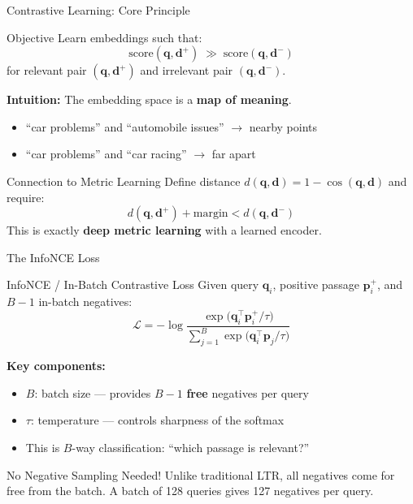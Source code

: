 \documentclass[aspectratio=169]{beamer}
\newif\ifanimated
\newcommand{\cpause}{\ifanimated\pause\fi}
\newcommand{\vq}{\mathbf{q}}
\newcommand{\vp}{\mathbf{p}}
\newcommand{\vd}{\mathbf{d}}
\begin{document}
\begin{frame}[plain]
\sectionpage
\end{frame}

\begin{frame}{Contrastive Learning: Core Principle}
\begin{block}{Objective}
Learn embeddings such that:
$$\text{score}(\vq, \vd^+) \;\gg\; \text{score}(\vq, \vd^-)$$
for relevant pair $(\vq, \vd^+)$ and irrelevant pair $(\vq, \vd^-)$.
\end{block}

\cpause
\vspace{1em}

\textbf{Intuition:} The embedding space is a \textbf{map of meaning}.
\begin{itemize}
    \item ``car problems'' and ``automobile issues'' $\to$ nearby points
    \item ``car problems'' and ``car racing'' $\to$ far apart
\end{itemize}

\cpause
\vspace{0.5em}

\begin{exampleblock}{Connection to Metric Learning}
Define distance $d(\vq, \vd) = 1 - \cos(\vq, \vd)$ and require:
$$d(\vq, \vd^+) + \text{margin} < d(\vq, \vd^-)$$
This is exactly \textbf{deep metric learning} with a learned encoder.
\end{exampleblock}
\end{frame}

\begin{frame}{The InfoNCE Loss}
\begin{block}{InfoNCE / In-Batch Contrastive Loss}
Given query $\vq_i$, positive passage $\vp_i^+$, and $B-1$ in-batch negatives:
$$\mathcal{L} = -\log \frac{\exp\!\bigl(\vq_i^\top \vp_i^+ / \tau\bigr)}{\displaystyle\sum_{j=1}^{B} \exp\!\bigl(\vq_i^\top \vp_j / \tau\bigr)}$$
\end{block}

\cpause
\vspace{0.5em}

\textbf{Key components:}
\begin{itemize}
    \item $B$: batch size --- provides $B-1$ \textbf{free} negatives per query
    \item $\tau$: temperature --- controls sharpness of the softmax
    \item This is $B$-way classification: ``which passage is relevant?''
\end{itemize}

\cpause
\vspace{0.5em}

\begin{alertblock}{No Negative Sampling Needed!}
Unlike traditional LTR, all negatives come for free from the batch. A batch of 128 queries gives 127 negatives per query.
\end{alertblock}
\end{frame}
\end{document}
